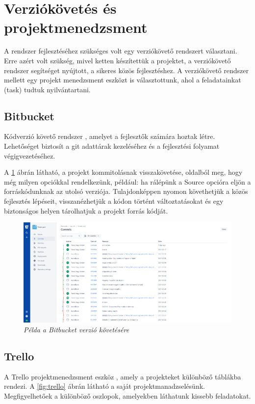 \section{Verziókövetés és projektmenedzsment}
A rendszer fejlesztéséhez szükséges volt egy verziókövető rendszert választani. Erre azért volt szükség, mivel ketten készítettük a projektet, a verziókövető rendszer segítséget nyújtott, a sikeres közös fejlesztéshez. A verziókövető rendszer mellett egy projekt menedzsment eszközt is választottunk, ahol a feladatainkat (task) tudtuk nyilvántartani.
\subsection{Bitbucket}
Kódverzió követő rendszer \cite{bitbucket}, amelyet a fejlesztők számára hoztak létre. Lehetőséget biztosít a git adattárak kezeléséhez és a fejlesztési folyamat végigvezetéséhez. 

A \ref{fig:bitbu} ábrán látható, a projekt kommitolásnak visszakövetése, oldalból meg, hogy még milyen opciókkal rendelkezünk, például: ha rálépünk a Source opcióra eljön a forráskódunknak az utolsó verziója. Tulajdonképpen nyomon követhetjük a közös fejlesztés lépéseit, visszanézhetjük a kódon történt változtatásokat és egy biztonságos helyen tárolhatjuk a projekt forrás kódját.
\begin{figure}[H]
	\centering
	\includegraphics[width=0.8\linewidth]{figures/images/bitbucket.png}
	\caption[Példa a Bitbucket verzió követésére]{\textit{Példa a Bitbucket verzió követésére}}
	\label{fig:bitbu}
\end{figure}
\subsection{Trello}
A Trello projektmenedzsment eszköz \cite{trello}, amely a projekteket különböző táblákba rendezi. A \ref{fig:trello} ábrán látható a saját projektmanadzselésünk. Megfigyelhetőek a különböző oszlopok, amelyekben láthatunk kissebb feladatokat. 

